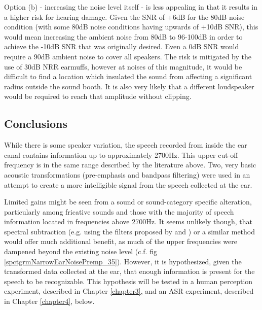 \documentclass[dissertation,copyright]{uathesis}
\begin{document}
Option (b) - increasing the noise level itself - is less appealing in that it results in a higher risk for hearing damage.  Given the SNR of +6dB for the 80dB noise condition (with some 80dB noise conditions having upwards of +10dB SNR), this would mean increasing the ambient noise from 80dB to 96-100dB in order to achieve the -10dB SNR that was originally desired.  Even a 0dB SNR would require a 90dB ambient noise to cover all speakers. The risk is mitigated by the use of 30dB NRR earmuffs, however at noises of this magnitude, it would be difficult to find a location which insulated the sound from affecting a significant radius outside the sound booth.  It is also very likely that a different loudspeaker would be required to reach that amplitude without clipping.

\subsection{Conclusions}

While there is some speaker variation, the speech recorded from inside the ear canal contains information up to approximately 2700Hz.  This upper cut-off frequency is in the same range described by the literature above.  Two, very basic acoustic transformations (pre-emphasis and bandpass filtering) were used in an attempt to create a more intelligible signal from the speech collected at the ear.

Limited gains might be seen from a sound or sound-category specific alteration, particularly among fricative sounds and those with the majority of speech information located in frequencies above 2700Hz.  It seems unlikely though, that spectral subtraction (e.g. using the filters proposed by \cite{hansen:97b} and \cite{reinfeldt:10}) or a similar method would offer much additional benefit, as much of the upper frequencies were dampened beyond the existing noise level (c.f. fig \ref{spctgrmNarrowEarNoisePremp_35}).  However, it is hypothesized, given the transformed data collected at the ear, that enough information is present for the speech to be recognizable.  This hypothesis will be tested in a human perception experiment, described in Chapter \ref{chapter3}, and an ASR experiment, described in Chapter \ref{chapter4}, below.









\end{document}
